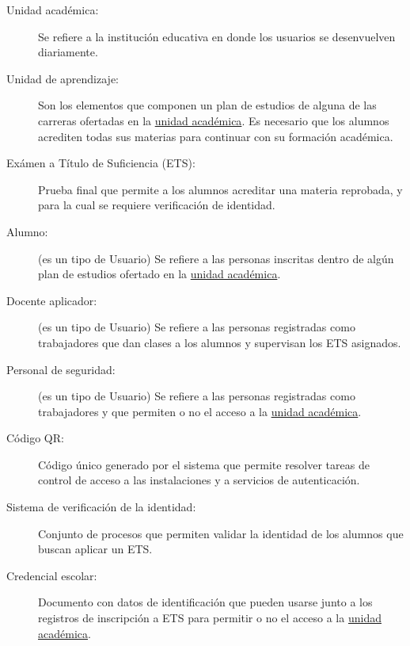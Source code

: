 \begin{description}
	 \item[\hypertarget{tUnidadAcademica}{Unidad académica:}] Se refiere a la institución educativa en donde los usuarios se desenvuelven diariamente.
	
	\item[\hypertarget{tUnidadAprendizaje}{Unidad de aprendizaje:}] Son los elementos que componen un plan de estudios de alguna de las carreras ofertadas en la \hyperlink{tUnidadAcademica}{unidad académica}. Es necesario que los alumnos acrediten todas sus materias para continuar con su formación académica.
	
	\item[\hypertarget{tETS}{Exámen a Título de Suficiencia (ETS):}] Prueba final que permite a los alumnos acreditar una materia reprobada, y para la cual se requiere verificación de identidad.
	
	\item[\hypertarget{tAlumno}{Alumno:}] (es un tipo de Usuario) Se refiere a las personas inscritas dentro de algún plan de estudios ofertado en la \hyperlink{tUnidadAcademica}{unidad académica}.
	
	\item[\hypertarget{tDocenteAplicador}{Docente aplicador:}] (es un tipo de Usuario) Se refiere a las personas registradas como trabajadores que dan clases a los alumnos y supervisan los ETS asignados.
	
	\item[\hypertarget{tPersonalSeguridad}{Personal de seguridad:}] (es un tipo de Usuario) Se refiere a las personas registradas como trabajadores y que permiten o no el acceso a la \hyperlink{tUnidadAcademica}{unidad académica}.
	
	\item[\hypertarget{tCodigoQR}{Código QR:}] Código único generado por el sistema que permite resolver tareas de control de acceso a las instalaciones y a servicios de autenticación.
	
	\item[\hypertarget{tSistemaVerificacion}{Sistema de verificación de la identidad:}] Conjunto de procesos que permiten validar la identidad de los alumnos que buscan aplicar un ETS.
	
	\item[\hypertarget{tCredencialEscolar}{Credencial escolar:}] Documento con datos de identificación que pueden usarse junto a los registros de inscripción a ETS para permitir o no el acceso a la \hyperlink{tUnidadAcademica}{unidad académica}.
	

\end{description}
